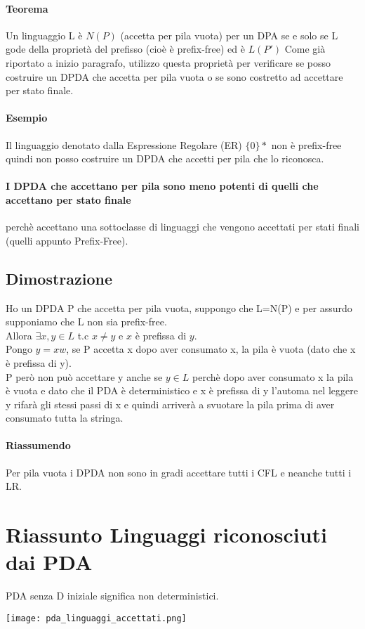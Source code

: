 \paragraph*{Teorema} Un linguaggio L è $N(P)$ (accetta per pila vuota) per un DPA
se e solo se L gode della proprietà del prefisso (cioè è prefix-free) ed è $L(P')$
Come già riportato a inizio paragrafo, utilizzo questa proprietà per verificare se posso
costruire un DPDA che accetta per pila vuota o se sono costretto ad accettare per stato
finale.
\paragraph*{Esempio} Il linguaggio denotato dalla Espressione Regolare (ER) $\{0\}*$ non è prefix-free
quindi non posso costruire un DPDA che accetti per pila che lo riconosca.
\paragraph*{I DPDA che accettano per pila sono meno potenti di quelli che accettano per stato finale} perchè accettano
una sottoclasse di linguaggi che vengono accettati per stati finali (quelli appunto Prefix-Free).
\subsection*{Dimostrazione}Ho un DPDA P che accetta per pila vuota, suppongo che
L=N(P) e per assurdo supponiamo che L non sia prefix-free.
\\ Allora $\exists x,y \in L$ t.c $x \neq y$ e $x$ è prefissa di $y$.
\\ Pongo $y = xw$, se P accetta x dopo aver consumato x, la pila è vuota (dato che x è prefissa di y).
\\ P però non può accettare y anche se $y \in L$ perchè dopo aver consumato x la pila è vuota e dato che
il PDA è deterministico e x è prefissa di y l'automa nel leggere y rifarà gli stessi passi di x e quindi
arriverà a svuotare la pila prima di aver consumato tutta la stringa.
\paragraph*{Riassumendo}Per pila vuota i DPDA non sono in gradi accettare tutti i CFL e neanche tutti i LR.
\section{Riassunto Linguaggi riconosciuti dai PDA}
PDA senza D iniziale significa non deterministici.
\begin{center}
    \texttt{[image: pda\_linguaggi\_accettati.png]}
\end{center}


